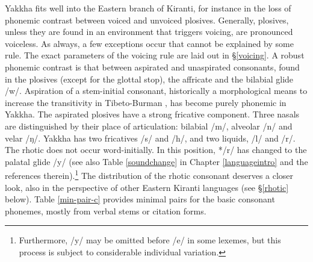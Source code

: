Yakkha fits well into the Eastern branch of Kiranti, for instance in the loss of phonemic  contrast between voiced and unvoiced plosives. Generally, plosives, unless they are found in an environment that triggers voicing, are pronounced voiceless. As always, a few exceptions occur that cannot be explained by some rule. The exact parameters of the voicing rule are laid out in  §\ref{voicing}. A robust phonemic contrast is that between aspirated and unaspirated consonants, found in the plosives (except for the glottal stop), the affricate and the bilabial glide /w/. Aspiration of a stem-initial consonant, historically a morphological means to increase the transitivity in Tibeto-Burman \citep{Michailovsky1994Manner, Jacques2012_Internal, Hill2014_Note}, has become purely phonemic in Yakkha.  The aspirated plosives have a strong fricative component. Three nasals are distinguished by their place of articulation: bilabial  /m/, alveolar /n/ and velar /ŋ/. Yakkha has two fricatives /s/ and /h/, and two liquids, /l/ and /r/. The rhotic does not occur word-initially. In this position, */r/ has changed to the palatal glide /y/ (see also  Table \ref{soundchange} in Chapter \ref{languageintro} and the references therein).\footnote{Furthermore, /y/ may be omitted before /e/ in some lexemes, but this process is subject to considerable individual variation.}  The distribution of the rhotic consonant deserves a closer look, also in the perspective of other Eastern Kiranti languages (see §\ref{rhotic} below). Table \ref{min-pair-c} provides minimal pairs for the basic consonant phonemes, mostly from verbal stems or citation forms.



